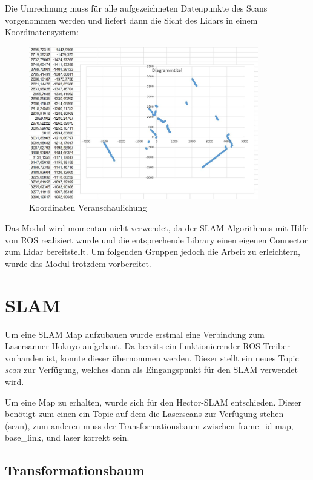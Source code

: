 Die Umrechnung muss für alle aufgezeichneten Datenpunkte des Scans vorgenommen werden und liefert dann die Sicht des Lidars in einem Koordinatensystem:

\begin{figure}[h]
\begin{center}
\includegraphics[width=10cm]{images/chapter5/kartKoord.jpg}
\caption{Koordinaten Veranschaulichung}
\label{Koordinaten_veranschaulichung}
\end{center}
\end{figure}




Das Modul wird momentan nicht verwendet, da der SLAM Algorithmus mit Hilfe von ROS realisiert wurde und die entsprechende Library einen eigenen Connector zum Lidar bereitstellt. Um folgenden Gruppen jedoch die Arbeit zu erleichtern, wurde das Modul trotzdem vorbereitet.



\section{SLAM}

Um eine SLAM Map aufzubauen wurde erstmal eine Verbindung zum Lasersanner Hokuyo aufgebaut. Da bereits ein funktionierender ROS-Treiber vorhanden ist, konnte dieser übernommen werden. Dieser stellt ein neues Topic \textit{scan} zur Verfügung, welches dann als Eingangspunkt für den SLAM verwendet wird. 

Um eine Map zu erhalten, wurde sich für den Hector-SLAM entschieden. Dieser benötigt zum einen ein Topic auf dem die Laserscans zur Verfügung stehen (scan), zum anderen muss der Transformationsbaum zwischen frame\_id map, base\_link, und laser korrekt sein.  

\subsection{Transformationsbaum}

